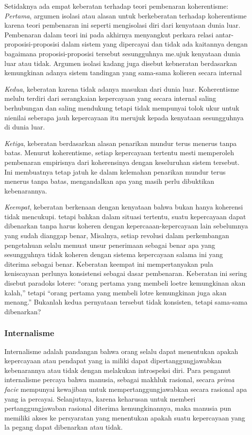 \documentclass[10pt,a4paper]{article}
\begin{document}
\begin{multicols}{2}
Setidaknya ada empat keberatan terhadap teori pembenaran koherentisme:
\emph{Pertama}, argumen isolasi atau alasan untuk berkeberatan terhadap
koherentisme karena teori pembenaran ini seperti mengisolasi diri dari
kenyataan dunia luar. Pembenaran dalam teori ini pada akhirnya
menyangkut perkara relasi antar-proposisi-proposisi dalam sistem yang
dipercayai dan tidak ada kaitannya dengan bagaimana proposisi-proposisi
tersebut sesungguhnya me.ujuk kenyataan dunia luar atau tidak. Argumen
isolasi kadang juga disebut kebneratan berdasarkan kemungkinan adanya
sistem tandingan yang sama-sama kolieren secara internal

\emph{Kedua}, keberatan karena tidak adanya masukan dari dunia luar.
Koherentisme melulu terdiri dari serangkaian kepercayaan yang secara
internal saling berhubungan dan saling mendukung tetapi tidak mempunyai
tolok ukur untuk nienilai seberapa jauh kepercayaan itu merujuk kepada
kenyataan sesungguhnya di dunia luar.

\emph{Ketiga}, keberatan berdasarkan alasan penarikan mundur terus
menerus tanpa batas. Menurut koherentisme, setiap kepercayaan tertentu
mesti memperoleh pembenaran empirisnya dari koherensinya dengan
keseluruhan sistem tersebut. Ini membuatnya tetap jatuh ke dalam
kelemahan penarikan mundur terus menerus tanpa batas, mengandalkan apa
yang masih perlu dibuktikan kebenarannya.

\emph{Keempat}, keberatan berkenaan dengan kenyataan bahwa bukan hanya
koherensi tidak mencukupi. tetapi bahkan dalam situasi tertentu, suatu
kepercayaan dapat dibenarkan tanpa harus koheren dengan
kepercaaan-kepercayaan lain sebelumnya yang sudah dianggap benar,
Misalnya, setiap revolusi dalam perkembangan pengetahuan selalu memuat
unsur penerimaan sebagai benar apa yang sesungguhnya tidak koheren
dengan sistema kepercayaan salama ini yang diterima sebagai benar.
Keberatan keempat ini mempertanyakan pula keniscayaan perlunya
konsistensi sebagai dasar pembenaran. Keberatan ini sering disebut
paradoks lotere: ``orang pertama yang membeli loetre kemungkinan akan
kalah,'' tetapi ``orang pertama yang membeli lotre kemungkinan juga akan
menang.'' Bukanlah kedua pernyataan tersebut tidak konsisten, tetapi
sama-sama dibenarkan?

\hypertarget{internalisme}{%
\subsubsection{Internalisme}\label{internalisme}}

Internalisme adalah pandangan bahwa orang selalu dapat menentukan apakah
kepercayaan atau pendapat yang ia miliki dapat dipertanggungjawabkan
kebenarannya atau tidak dengan melakukan introspeksi diri. Para penganut
internalisme percaya bahwa manusia, sebagai makhluk rasional, secara
\emph{prima facie} mempunyai kewajiban untuk mempertanggungjawabkan
secara rasional apa yang ia percayai. Selanjutnya, karena keharusan
untuk memberi pertanggungjawaban rasional diterima kemungkinannya, maka
manusia pun memiliki akses ke persyaratan yang menentukan apakah suatu
kepercayaan yang la pegang dapat dibenarkan atau tidak.


\end{multicols}
\end{document}
